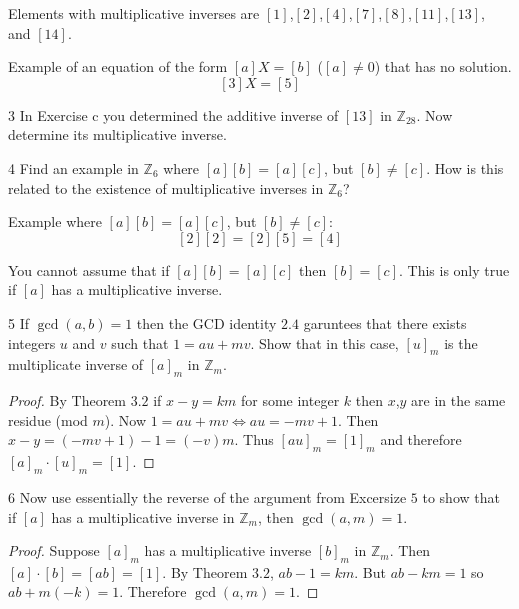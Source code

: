 Elements with multiplicative inverses are $[1]$,$[2]$,$[4]$,$[7]$,$[8]$,$[11]$,$[13]$, and $[14]$.

Example of an equation of the form $[a]X = [b]$ ($[a] \not = 0$)
    that has no solution.
\[[3]X = [5]\]

\begin{problem}{3}
    In Exercise c you determined the additive inverse of $[13]$ in $\mathbb{Z}_{28}$.
    Now determine its multiplicative inverse.
\end{problem}
\unsolved

\begin{problem}{4}
    Find an example in $\mathbb{Z}_6$ where $[a][b] = [a][c]$, but $[b] \not = [c]$.
    How is this related to the existence of  multiplicative inverses in $\mathbb{Z}_6$?
\end{problem}
\solved

Example where $[a][b] = [a][c]$, but $[b] \not = [c]$:
\[[2][2] = [2][5] = [4]\]

You cannot assume that if  $[a][b] = [a][c]$ then $[b] = [c]$.
This is only true if $[a]$ has a multiplicative inverse.

\begin{problem}{5}
    If $\gcd(a, b) = 1$ then the GCD identity $2.4$ garuntees that there exists 
    integers $u$ and $v$ such that $1 = au + mv$. Show that in this case, 
    $[u]_m$ is the multiplicate inverse of $[a]_m$ in $\mathbb{Z}_m$.
\end{problem}
\solved

\begin{proof}
    By Theorem $3.2$ if $x - y = km$ for some integer $k$ then $x$,$y$ are in the same residue (mod $m$).
    Now $1 = au + mv \iff au = -mv + 1$.
    Then $x - y = (-mv + 1) - 1 = (-v)m$.
    Thus ${[au]}_m = {[1]}_m$ and therefore $[a]_m \cdot [u]_m = [1]$.
\end{proof}

\begin{problem}{6}
    Now use essentially the reverse of the argument from Excersize $5$
    to show that if $[a]$ has a multiplicative inverse in $\mathbb{Z}_m$,
    then $\gcd(a, m) = 1$.
\end{problem}
\solved

\begin{proof}
    Suppose $[a]_m$ has a multiplicative inverse $[b]_m$ in $\mathbb{Z}_m$.
    Then $[a] \cdot [b] = [ab] = [1]$.
    By Theorem $3.2$, $ab - 1 = km$.
    But $ab - km = 1$ so $ab + m(-k) = 1$.
    Therefore $\gcd(a, m) = 1$.
\end{proof}

